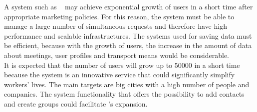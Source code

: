 A system such as \projectname~ may achieve exponential growth of users in a short time after appropriate marketing policies. For this reason, the system must be able to manage a large number of simultaneous requests and therefore have high-performance and scalable infrastructures. The systems used for saving data must be efficient, because with the growth of users, the increase in the amount of data about meetings, user profiles and transport means would be considerable.\\
It is expected that the number of users will grow up to 50000 in a short time because the system is an innovative service that could significantly simplify workers' lives. The main targets are big cities with a high number of people and companies. The system functionality that offers the possibility to add contacts and create groups could facilitate \projectname's expansion.